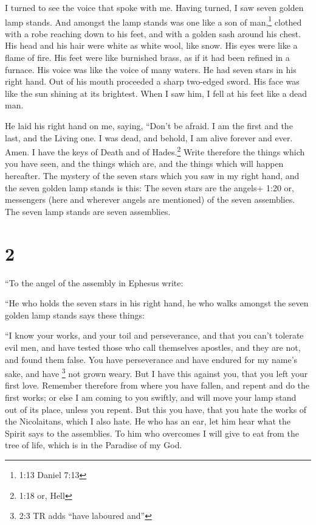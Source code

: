  I turned to see the voice that spoke with me. Having
turned, I saw seven golden lamp stands.  And amongst the
lamp stands was one like a son of man,\footnote{1:13 Daniel 7:13}
clothed with a robe reaching down to his feet, and with a golden sash
around his chest.  His head and his hair were white as
white wool, like snow. His eyes were like a flame of fire. 
His feet were like burnished brass, as if it had been refined in a
furnace. His voice was like the voice of many waters.  He
had seven stars in his right hand. Out of his mouth proceeded a sharp
two-edged sword. His face was like the sun shining at its brightest.
 When I saw him, I fell at his feet like a dead man.

He laid his right hand on me, saying, ``Don't be afraid. I am the first
and the last,  and the Living one. I was dead, and behold,
I am alive forever and ever. Amen. I have the keys of Death and of
Hades.\footnote{1:18 or, Hell}  Write therefore the things
which you have seen, and the things which are, and the things which will
happen hereafter.  The mystery of the seven stars which you
saw in my right hand, and the seven golden lamp stands is this: The
seven stars are the angels+ 1:20 or, messengers (here and wherever
angels are mentioned) of the seven assemblies. The seven lamp stands are
seven assemblies.

\hypertarget{section-1}{%
\section{2}\label{section-1}}

 ``To the angel of the assembly in Ephesus write:

``He who holds the seven stars in his right hand, he who walks amongst
the seven golden lamp stands says these things:

 ``I know your works, and your toil and perseverance, and
that you can't tolerate evil men, and have tested those who call
themselves apostles, and they are not, and found them false.
 You have perseverance and have endured for my name's sake,
and have \footnote{2:3 TR adds ``have laboured and''} not grown weary.
 But I have this against you, that you left your first love.
 Remember therefore from where you have fallen, and repent
and do the first works; or else I am coming to you swiftly, and will
move your lamp stand out of its place, unless you repent. 
But this you have, that you hate the works of the Nicolaitans, which I
also hate.  He who has an ear, let him hear what the Spirit
says to the assemblies. To him who overcomes I will give to eat from the
tree of life, which is in the Paradise of my God.


